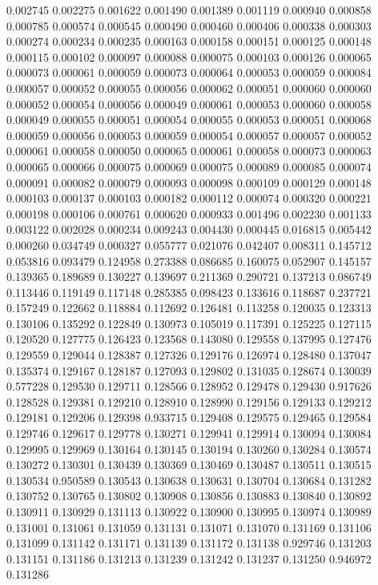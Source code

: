 0.002745
0.002275
0.001622
0.001490
0.001389
0.001119
0.000940
0.000858
0.000785
0.000574
0.000545
0.000490
0.000460
0.000406
0.000338
0.000303
0.000274
0.000234
0.000235
0.000163
0.000158
0.000151
0.000125
0.000148
0.000115
0.000102
0.000097
0.000088
0.000075
0.000103
0.000126
0.000065
0.000073
0.000061
0.000059
0.000073
0.000064
0.000053
0.000059
0.000084
0.000057
0.000052
0.000055
0.000056
0.000062
0.000051
0.000060
0.000060
0.000052
0.000054
0.000056
0.000049
0.000061
0.000053
0.000060
0.000058
0.000049
0.000055
0.000051
0.000054
0.000055
0.000053
0.000051
0.000068
0.000059
0.000056
0.000053
0.000059
0.000054
0.000057
0.000057
0.000052
0.000061
0.000058
0.000050
0.000065
0.000061
0.000058
0.000073
0.000063
0.000065
0.000066
0.000075
0.000069
0.000075
0.000089
0.000085
0.000074
0.000091
0.000082
0.000079
0.000093
0.000098
0.000109
0.000129
0.000148
0.000103
0.000137
0.000103
0.000182
0.000112
0.000074
0.000320
0.000221
0.000198
0.000106
0.000761
0.000620
0.000933
0.001496
0.002230
0.001133
0.003122
0.002028
0.000234
0.009243
0.004430
0.000445
0.016815
0.005442
0.000260
0.034749
0.000327
0.055777
0.021076
0.042407
0.008311
0.145712
0.053816
0.093479
0.124958
0.273388
0.086685
0.160075
0.052907
0.145157
0.139365
0.189689
0.130227
0.139697
0.211369
0.290721
0.137213
0.086749
0.113446
0.119149
0.117148
0.285385
0.098423
0.133616
0.118687
0.237721
0.157249
0.122662
0.118884
0.112692
0.126481
0.113258
0.120035
0.123313
0.130106
0.135292
0.122849
0.130973
0.105019
0.117391
0.125225
0.127115
0.120520
0.127775
0.126423
0.123568
0.143080
0.129558
0.137995
0.127476
0.129559
0.129044
0.128387
0.127326
0.129176
0.126974
0.128480
0.137047
0.135374
0.129167
0.128187
0.127093
0.129802
0.131035
0.128674
0.130039
0.577228
0.129530
0.129711
0.128566
0.128952
0.129478
0.129430
0.917626
0.128528
0.129381
0.129210
0.128910
0.128990
0.129156
0.129133
0.129212
0.129181
0.129206
0.129398
0.933715
0.129408
0.129575
0.129465
0.129584
0.129746
0.129617
0.129778
0.130271
0.129941
0.129914
0.130094
0.130084
0.129995
0.129969
0.130164
0.130145
0.130194
0.130260
0.130284
0.130574
0.130272
0.130301
0.130439
0.130369
0.130469
0.130487
0.130511
0.130515
0.130534
0.950589
0.130543
0.130638
0.130631
0.130704
0.130684
0.131282
0.130752
0.130765
0.130802
0.130908
0.130856
0.130883
0.130840
0.130892
0.130911
0.130929
0.131113
0.130922
0.130900
0.130995
0.130974
0.130989
0.131001
0.131061
0.131059
0.131131
0.131071
0.131070
0.131169
0.131106
0.131099
0.131142
0.131171
0.131139
0.131172
0.131138
0.929746
0.131203
0.131151
0.131186
0.131213
0.131239
0.131242
0.131237
0.131250
0.946972
0.131286
